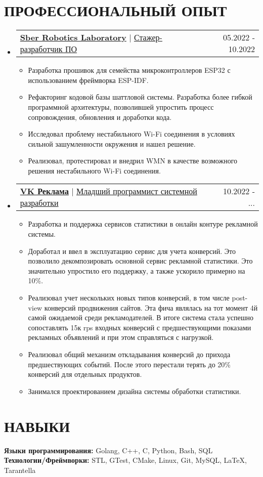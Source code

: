 \documentclass[letterpaper,11pt]{article}
\makeatletter
\newcommand{\resumeItem}[1]{
  \item\small{
    {#1 \vspace{-2pt}}
  }
}
\newcommand{\lineSeparatedText}[2]{
	{\textbf{\large{\underline{#1}}}} $|$ {\large{\underline{#2}}}
}
\newcommand{\resumeExpItem}[2] {
	\item 
	\begin{tabular*}{1.001\textwidth}{l@{\extracolsep{\fill}}r}
	    #1 & {\small#2}
    \end{tabular*}\vspace{-5pt}
}
\newcommand{\resumeSubHeadingListStart}{\begin{itemize}[leftmargin=0.0in, label={}]}
\newcommand{\resumeSubHeadingListEnd}{\end{itemize}}
\newcommand{\resumeItemListStart}{\begin{itemize}}
\newcommand{\resumeItemListEnd}{\end{itemize}\vspace{-5pt}}
\makeatother
\begin{document}
\section{ПРОФЕССИОНАЛЬНЫЙ ОПЫТ}
\resumeSubHeadingListStart
\resumeExpItem {\lineSeparatedText{Sber Robotics Laboratory}{Стажер-разработчик ПО}}{05.2022 - 10.2022}
\resumeItemListStart
\resumeItem{\normalsize{Разработка прошивок для семейства микроконтроллеров ESP32 с использованием фреймворка ESP-IDF.}}
\resumeItem{\normalsize{Рефакторинг кодовой базы шаттловой системы. Разработка более гибкой программной архитектуры, позволившей упростить процесс сопровождения, обновления и доработки кода.}}
\resumeItem{\normalsize{Исследовал проблему нестабильного Wi-Fi соединения в условиях сильной зашумленности окружения и нашел решение.
}}
\resumeItem{\normalsize{Реализовал, протестировал и внедрил WMN в качестве возможного решения нестабильного Wi-Fi соединения.}}

\resumeItemListEnd 
\resumeExpItem {\lineSeparatedText{VK Реклама}{Младший программист системной разработки}}{10.2022 - ...}
\resumeItemListStart
\resumeItem{\normalsize{Разработка и поддержка сервисов статистики в онлайн контуре рекламной системы.}}
\resumeItem{\normalsize{Доработал и ввел в эксплуатацию сервис для учета конверсий. Это позволило декомпозировать основной сервис рекламной статистики. Это значительно упростило его поддержку, а также ускорило примерно на 10\%.}}
\resumeItem{\normalsize{Реализовал учет нескольких новых типов конверсий, в том числе post-view конверсий продвижения сайтов. Эта фича являлась на тот момент 4й самой ожидаемой среди рекламодателей. В итоге система стала успешно сопоставлять 15к rps входных конверсий с предшествующими показами рекламных объявлений и при этом справляться с нагрузкой.}}
\resumeItem{\normalsize{Реализовал общий механизм откладывания конверсий до прихода предшествующих событий. После этого перестали терять до 20\% конверсий для отдельных продуктов.}}
\resumeItem{\normalsize{Занимался проектированием дизайна системы обработки статистики.}}
\resumeItemListEnd 
\resumeSubHeadingListEnd
    
\vspace{-12pt}

\section{НАВЫКИ}
 \begin{itemize}[leftmargin=0.15in, label={}]
    \small{\item{
     \textbf{\normalsize{Языки программирования:}}{ \normalsize{Golang, C++, C, Python, Bash, SQL}} \\
     \textbf{\normalsize{Технологии/Фреймворки:}}{ \normalsize{STL, GTest, CMake, Linux, Git, MySQL, \LaTeX, Tarantella}} \\
    }}
 \end{itemize}
 \vspace{-15pt}
 
\end{document}
